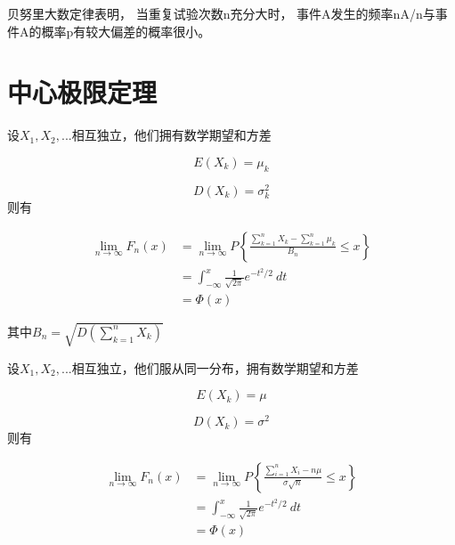 贝努里大数定律表明， 当重复试验次数n充分大时， 事件A发生的频率nA/n与事件A的概率p有较大偏差的概率很小。

\section{中心极限定理}

\begin{theorem}[Lyapunov中心极限定理]
    设$X_1,X_2,...$相互独立，他们拥有数学期望和方差

\begin{equation}
 E(X_k) = \mu_k
\end{equation}

\begin{equation}
  D(X_k) = \sigma_k^2
\end{equation}
则有

\begin{equation}
\begin{aligned} \lim _{n \rightarrow \infty} F_{n}(x) &=\lim _{n \rightarrow \infty} P\left\{\frac{\sum_{k=1}^{n} X_{k}-\sum_{k=1}^{n} \mu_{k}}{B_{n}} \leq x\right\}
\\ &=\int_{-\infty}^{x} \frac{1}{\sqrt{2 \pi}} {e}^{-{t}^{2} / 2} {~d} {t}
\\&=\Phi(x)
 \end{aligned}
 \end{equation}

其中$B_n=\sqrt{D\left(\sum_{k=1}^{n} X_{k}\right)}$
\end{theorem}

\begin{theorem}
    设$X_1,X_2,...$相互独立，他们服从同一分布，拥有数学期望和方差

\begin{equation}
 E(X_k) = \mu
\end{equation}

\begin{equation}
  D(X_k) = \sigma^2
\end{equation}
则有

\begin{equation}\begin{aligned}
\lim _{n \rightarrow \infty} F_{n}(x)&=\lim _{n \rightarrow \infty} P\left\{\frac{\sum_{i=1}^{n} X_{i}-n \mu}{\sigma \sqrt{n}} \leq x\right\}
\\ &=\int_{-\infty}^{x} \frac{1}{\sqrt{2 \pi}} {e}^{-{t}^{2} / 2} {~d} {t}
\\&=\Phi(x)
\end{aligned}
\end{equation}
\end{theorem}

